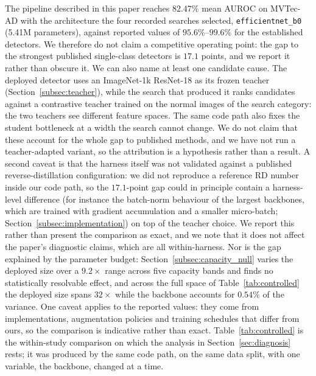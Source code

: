 The pipeline described in this paper reaches $82.47\%$ mean AUROC on MVTec-AD with
the architecture the four recorded searches selected, \texttt{efficientnet\_b0}
(5.41M parameters),
against reported values of $95.6\%$--$99.6\%$ for the established detectors. We
therefore do not claim a competitive operating point: the gap to the strongest
published single-class detectors is $17.1$ points, and we report it
rather than obscure it. We can also name at least one candidate cause. The
deployed detector uses an ImageNet-1k ResNet-18 as its frozen teacher
(Section~\ref{subsec:teacher}), while the search that produced it ranks candidates
against a contrastive teacher trained on the normal images of the search category:
the two teachers see different feature spaces. The same code path also fixes the
student bottleneck at a width the search cannot change. We do not claim that these
account for the whole gap to published methods, and we have not run a
teacher-adapted variant, so the attribution is a hypothesis rather than a result.
A second caveat is that the harness itself was not validated against a published
reverse-distillation configuration: we did not reproduce a reference RD number
inside our code path, so the $17.1$-point gap could in principle contain a
harness-level difference (for instance the batch-norm behaviour of the largest
backbones, which are trained with gradient accumulation and a smaller micro-batch;
Section~\ref{subsec:implementation}) on top of the teacher choice. We report this
rather than present the comparison as exact, and we note that it does not affect
the paper's diagnostic claims, which are all within-harness. Nor is the gap
explained by the parameter budget:
Section~\ref{subsec:capacity_null} varies the deployed size over a $9.2\times$
range across five capacity bands and finds no statistically resolvable effect, and
across the full space of Table~\ref{tab:controlled} the deployed size spans
$32\times$ while the backbone accounts for $0.54\%$ of the variance. One caveat
applies to the reported values: they come from implementations, augmentation
policies and training schedules that differ from ours, so the comparison is
indicative rather than exact. Table~\ref{tab:controlled} is the within-study
comparison on which the analysis in Section~\ref{sec:diagnosis} rests; it was
produced by the same code path, on the same data split, with one variable, the
backbone, changed at a time.

